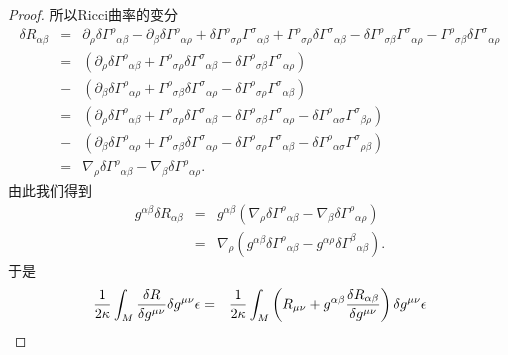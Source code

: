 \begin{proof}
            所以Ricci曲率的变分
            \begin{eqnarray*}
                \delta{R}_{\alpha\beta}&=&\partial_\rho\delta{\varGamma^\rho}_{\alpha\beta}-\partial_\beta\delta{\varGamma^\rho}_{\alpha\rho}+\delta{\varGamma^\rho}_{\sigma\rho}{\varGamma^\sigma}_{\alpha\beta}+{\varGamma^\rho}_{\sigma\rho}\delta{\varGamma^\sigma}_{\alpha\beta}-\delta{\varGamma^\rho}_{\sigma\beta}{\varGamma^\sigma}_{\alpha\rho}-{\varGamma^\rho}_{\sigma\beta}\delta{\varGamma^\sigma}_{\alpha\rho}\\
                &=&\left(\partial_\rho\delta{\varGamma^\rho}_{\alpha\beta}+{\varGamma^\rho}_{\sigma\rho}\delta{\varGamma^\sigma}_{\alpha\beta}-\delta{\varGamma^\rho}_{\sigma\beta}{\varGamma^\sigma}_{\alpha\rho}\right)\\
                &-&\left(\partial_\beta\delta{\varGamma^\rho}_{\alpha\rho}+{\varGamma^\rho}_{\sigma\beta}\delta{\varGamma^\sigma}_{\alpha\rho}-\delta{\varGamma^\rho}_{\sigma\rho}{\varGamma^\sigma}_{\alpha\beta}\right)\\
                &=&\left(\partial_\rho\delta{\varGamma^\rho}_{\alpha\beta}+{\varGamma^\rho}_{\sigma\rho}\delta{\varGamma^\sigma}_{\alpha\beta}-\delta{\varGamma^\rho}_{\sigma\beta}{\varGamma^\sigma}_{\alpha\rho}-\delta{\varGamma^\rho}_{\alpha\sigma}{\varGamma^\sigma}_{\beta\rho}\right)\\
                &-&\left(\partial_\beta\delta{\varGamma^\rho}_{\alpha\rho}+{\varGamma^\rho}_{\sigma\beta}\delta{\varGamma^\sigma}_{\alpha\rho}-\delta{\varGamma^\rho}_{\sigma\rho}{\varGamma^\sigma}_{\alpha\beta}-\delta{\varGamma^\rho}_{\alpha\sigma}{\varGamma^\sigma}_{\rho\beta}\right)\\
                &=&\nabla_\rho\delta{\varGamma^\rho}_{\alpha\beta}-\nabla_\beta\delta{\varGamma^\rho}_{\alpha\rho}.
            \end{eqnarray*}
            由此我们得到
            \begin{eqnarray*}
                g^{\alpha\beta}\delta{R}_{\alpha\beta}&=&g^{\alpha\beta}\left(\nabla_\rho\delta{\varGamma^\rho}_{\alpha\beta}-\nabla_\beta\delta{\varGamma^\rho}_{\alpha\rho}\right)\\
                &=&\nabla_\rho\left(g^{\alpha\beta}\delta{\varGamma^\rho}_{\alpha\beta}-g^{\alpha\rho}\delta{\varGamma^\beta}_{\alpha\beta}\right).
            \end{eqnarray*}
            于是
            \begin{eqnarray}\label{eq:delta EHA 1}
                \frac{1}{2\kappa}\int_M\frac{\delta R}{\delta g^{\mu\nu}}\delta g^{\mu\nu}\epsilon&=&\frac{1}{2\kappa}\int_M\left({R}_{\mu\nu}+g^{\alpha\beta}\frac{\delta {R}_{\alpha\beta}}{\delta g^{\mu\nu}}\right)\delta g^{\mu\nu}\epsilon\notag\\

\end{eqnarray}
\end{proof}

